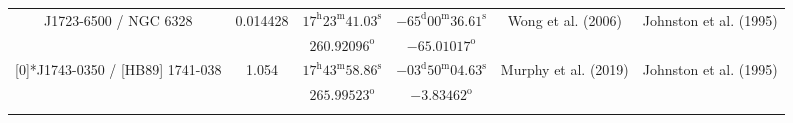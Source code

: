 \begin{landscape}
\begin{longtable}{cccccc}
 \multirow{2}[0]{*}{J1723-6500 / NGC 6328} & \multirow{2}[0]{*}{0.014428} &  
    $17^\text{h}23^\text{m}41.03^\text{s}$  & $ -65^\text{d}00^\text{m}36.61^\text{s}$  & 
    \multirow{2}[0]{*}{Wong et al. (2006)\cite{RedRef69_2006}}& \multirow{2}[0]{*}{Johnston et al. (1995)\cite{CoordRef0_1995}} \\*
     & & $260.92096^\text{o}$ & $-65.01017^\text{o}$ & & \\ \addlinespace 

  \multirow{2}[0]{*}{J1743-0350 / [HB89] 1741-038} & \multirow{2}[0]{*}{1.054} &  
    $17^\text{h}43^\text{m}58.86^\text{s}$  & $-03^\text{d}50^\text{m}04.63^\text{s}$  & 
    \multirow{2}[0]{*}{Murphy et al. (2019)\cite{RedRef46_2019}}& \multirow{2}[0]{*}{Johnston et al. (1995)\cite{CoordRef0_1995}} \\*
    & & $265.99523^\text{o}$ & $-3.83462^\text{o}$ & & \\ \addlinespace 


\end{longtable}
\end{landscape}
